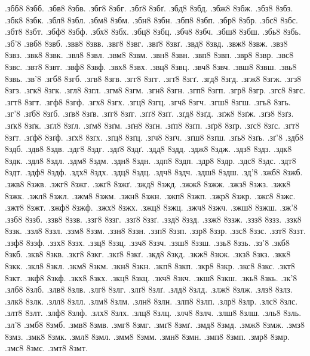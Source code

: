 {%
.збб8 8збб.
.збв8 8збв.
.збг8 8збг.
.збґ8 8збґ.
.збд8 8збд.
.збж8 8збж.
.збз8 8збз.
.збк8 8збк.
.збл8 8збл.
.збм8 8збм.
.збн8 8збн.
.збп8 8збп.
.збр8 8збр.
.збс8 8збс.
.збт8 8збт.
.збф8 8збф.
.збх8 8збх.
.збц8 8збц.
.збч8 8збч.
.збш8 8збш.
.збь8 8збь.
.зб'8
.звб8 8звб.
.звв8 8звв.
.звг8 8звг.
.звґ8 8звґ.
.звд8 8звд.
.звж8 8звж.
.звз8 8звз.
.звк8 8звк.
.звл8 8звл.
.звм8 8звм.
.звн8 8звн.
.звп8 8звп.
.звр8 8звр.
.звс8 8звс.
.звт8 8звт.
.звф8 8звф.
.звх8 8звх.
.звц8 8звц.
.звч8 8звч.
.звш8 8звш.
.звь8 8звь.
.зв'8
.згб8 8згб.
.згв8 8згв.
.згг8 8згг.
.згґ8 8згґ.
.згд8 8згд.
.згж8 8згж.
.згз8 8згз.
.згк8 8згк.
.згл8 8згл.
.згм8 8згм.
.згн8 8згн.
.згп8 8згп.
.згр8 8згр.
.згс8 8згс.
.згт8 8згт.
.згф8 8згф.
.згх8 8згх.
.згц8 8згц.
.згч8 8згч.
.згш8 8згш.
.згь8 8згь.
.зг'8
.зґб8 8зґб.
.зґв8 8зґв.
.зґг8 8зґг.
.зґґ8 8зґґ.
.зґд8 8зґд.
.зґж8 8зґж.
.зґз8 8зґз.
.зґк8 8зґк.
.зґл8 8зґл.
.зґм8 8зґм.
.зґн8 8зґн.
.зґп8 8зґп.
.зґр8 8зґр.
.зґс8 8зґс.
.зґт8 8зґт.
.зґф8 8зґф.
.зґх8 8зґх.
.зґц8 8зґц.
.зґч8 8зґч.
.зґш8 8зґш.
.зґь8 8зґь.
.зґ'8
.здб8 8здб.
.здв8 8здв.
.здг8 8здг.
.здґ8 8здґ.
.здд8 8здд.
.здж8 8здж.
.здз8 8здз.
.здк8 8здк.
.здл8 8здл.
.здм8 8здм.
.здн8 8здн.
.здп8 8здп.
.здр8 8здр.
.здс8 8здс.
.здт8 8здт.
.здф8 8здф.
.здх8 8здх.
.здц8 8здц.
.здч8 8здч.
.здш8 8здш.
.зд'8
.зжб8 8зжб.
.зжв8 8зжв.
.зжг8 8зжг.
.зжґ8 8зжґ.
.зжд8 8зжд.
.зжж8 8зжж.
.зжз8 8зжз.
.зжк8 8зжк.
.зжл8 8зжл.
.зжм8 8зжм.
.зжн8 8зжн.
.зжп8 8зжп.
.зжр8 8зжр.
.зжс8 8зжс.
.зжт8 8зжт.
.зжф8 8зжф.
.зжх8 8зжх.
.зжц8 8зжц.
.зжч8 8зжч.
.зжш8 8зжш.
.зж'8
.ззб8 8ззб.
.ззв8 8ззв.
.ззг8 8ззг.
.ззґ8 8ззґ.
.ззд8 8ззд.
.ззж8 8ззж.
.ззз8 8ззз.
.ззк8 8ззк.
.ззл8 8ззл.
.ззм8 8ззм.
.ззн8 8ззн.
.ззп8 8ззп.
.ззр8 8ззр.
.ззс8 8ззс.
.ззт8 8ззт.
.ззф8 8ззф.
.ззх8 8ззх.
.ззц8 8ззц.
.ззч8 8ззч.
.ззш8 8ззш.
.ззь8 8ззь.
.зз'8
.зкб8 8зкб.
.зкв8 8зкв.
.зкг8 8зкг.
.зкґ8 8зкґ.
.зкд8 8зкд.
.зкж8 8зкж.
.зкз8 8зкз.
.зкк8 8зкк.
.зкл8 8зкл.
.зкм8 8зкм.
.зкн8 8зкн.
.зкп8 8зкп.
.зкр8 8зкр.
.зкс8 8зкс.
.зкт8 8зкт.
.зкф8 8зкф.
.зкх8 8зкх.
.зкц8 8зкц.
.зкч8 8зкч.
.зкш8 8зкш.
.зкь8 8зкь.
.зк'8
.злб8 8злб.
.злв8 8злв.
.злг8 8злг.
.злґ8 8злґ.
.злд8 8злд.
.злж8 8злж.
.злз8 8злз.
.злк8 8злк.
.злл8 8злл.
.злм8 8злм.
.злн8 8злн.
.злп8 8злп.
.злр8 8злр.
.злс8 8злс.
.злт8 8злт.
.злф8 8злф.
.злх8 8злх.
.злц8 8злц.
.злч8 8злч.
.злш8 8злш.
.зль8 8зль.
.зл'8
.змб8 8змб.
.змв8 8змв.
.змг8 8змг.
.змґ8 8змґ.
.змд8 8змд.
.змж8 8змж.
.змз8 8змз.
.змк8 8змк.
.змл8 8змл.
.змм8 8змм.
.змн8 8змн.
.змп8 8змп.
.змр8 8змр.
.змс8 8змс.
.змт8 8змт.
}
